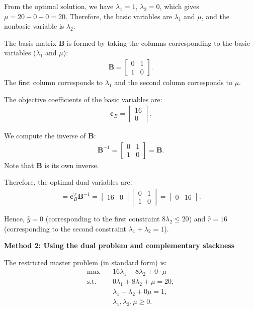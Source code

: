 \documentclass[11pt]{article}
\newcommand{\mb}[1]{\ensuremath{\boldsymbol{#1}}}
\begin{document}
\begin{enumerate}
\begin{enumerate}
From the optimal solution, we have $\lambda_1 = 1$, $\lambda_2 = 0$, which gives $\mu = 20 - 0 - 0 = 20$. Therefore, the basic variables are $\lambda_1$ and $\mu$, and the nonbasic variable is $\lambda_2$.

The basis matrix $\mb{B}$ is formed by taking the columns corresponding to the basic variables ($\lambda_1$ and $\mu$):
\begin{align*}
\mb{B} = \begin{bmatrix}
0 & 1 \\
1 & 0
\end{bmatrix}.
\end{align*}
The first column corresponds to $\lambda_1$ and the second column corresponds to $\mu$.

The objective coefficients of the basic variables are:
\begin{align*}
\mb{c}_B = \begin{bmatrix} 16 \\ 0 \end{bmatrix}.
\end{align*}

We compute the inverse of $\mb{B}$:
\begin{align*}
\mb{B}^{-1} = \begin{bmatrix}
0 & 1 \\
1 & 0
\end{bmatrix} = \mb{B}.
\end{align*}
Note that $\mb{B}$ is its own inverse.

Therefore, the optimal dual variables are:
\begin{align*}
[\hat{y}, \hat{r}] = \mb{c}_B^T \mb{B}^{-1} = \begin{bmatrix} 16 & 0 \end{bmatrix} \begin{bmatrix}
0 & 1 \\
1 & 0
\end{bmatrix} = \begin{bmatrix} 0 & 16 \end{bmatrix}.
\end{align*}

Hence, $\hat{y} = 0$ (corresponding to the first constraint $8\lambda_2 \leq 20$) and $\hat{r} = 16$ (corresponding to the second constraint $\lambda_1 + \lambda_2 = 1$).

\textbf{Method 2: Using the dual problem and complementary slackness}

The restricted master problem (in standard form) is:
\begin{align*}
\max \quad & 16\lambda_1 + 8\lambda_2 + 0 \cdot \mu \\
\text{s.t.} \quad & 0\lambda_1 + 8\lambda_2 + \mu = 20, \\
                       & \lambda_1 + \lambda_2 + 0\mu = 1, \\
                       & \lambda_1, \lambda_2, \mu \geq 0.
\end{align*}


\end{enumerate}
\end{enumerate}
\end{document}
